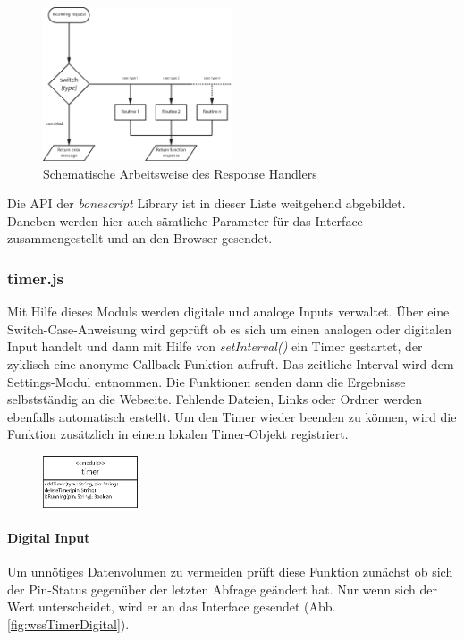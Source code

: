 \begin{figure}[ht]
  \centering
  \includegraphics[width = 0.5\textwidth]{documentation/images/wssResponseHandler.eps}
  \caption{Schematische Arbeitsweise des Response Handlers}
  \label{fig:wssResponseHandler}
\end{figure}

Die API der \textit{bonescript} Library ist in dieser Liste weitgehend abgebildet. Daneben werden hier auch sämtliche Parameter für das Interface zusammengestellt und an den Browser gesendet.

\subsubsection{timer.js}
Mit Hilfe dieses Moduls werden digitale und analoge Inputs verwaltet. Über eine Switch-Case-Anweisung wird geprüft ob es sich um einen analogen oder digitalen Input handelt und dann mit Hilfe von \textit{setInterval()} ein Timer gestartet, der zyklisch eine anonyme Callback-Funktion aufruft. Das zeitliche Interval wird dem Settings-Modul entnommen. Die Funktionen senden dann die Ergebnisse selbstständig an die Webseite. Fehlende Dateien, Links oder Ordner werden ebenfalls automatisch erstellt. Um den Timer wieder beenden zu können, wird die Funktion zusätzlich in einem lokalen Timer-Objekt registriert.

\begin{figure}
  \vspace{-18pt}
  \centering
  \includegraphics[width = 0.25\textwidth]{documentation/images/apiTimer.eps}
\end{figure}


\paragraph{Digital Input} Um unnötiges Datenvolumen zu vermeiden prüft diese Funktion zunächst ob sich der Pin-Status gegenüber der letzten Abfrage geändert hat. Nur wenn sich der Wert unterscheidet, wird er an das Interface gesendet (Abb. \ref{fig:wssTimerDigital}).


